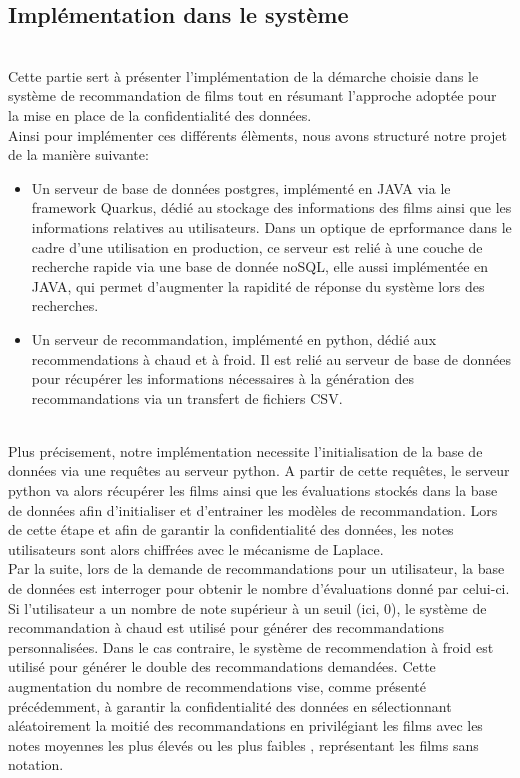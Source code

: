 \documentclass{article}
\begin{document}
\subsection{Implémentation dans le système}
$ $\\
Cette partie sert à présenter l'implémentation de la démarche choisie dans le système de recommandation de films tout en résumant l'approche adoptée pour la mise en place de la confidentialité des données.\\
Ainsi pour implémenter ces différents élèments, nous avons structuré notre projet de la manière suivante:\\
\begin{itemize}
    \item Un serveur de base de données postgres, implémenté en JAVA via le framework Quarkus, dédié au stockage des informations des films ainsi que les informations relatives au utilisateurs.
    Dans un optique de eprformance dans le cadre d'une utilisation en production, ce serveur est relié à une couche de recherche rapide via une base de donnée noSQL, elle aussi implémentée en JAVA, 
    qui permet d'augmenter la rapidité de réponse du système lors des recherches.
    \item Un serveur de recommandation, implémenté en python, dédié aux recommendations à chaud et à froid. Il est relié au serveur de base de données pour récupérer les 
    informations nécessaires à la génération des recommandations via un transfert de fichiers CSV.
\end{itemize}
$ $\\
Plus précisement, notre implémentation necessite l'initialisation de la base de données via une requêtes au serveur python. A partir de cette requêtes, le serveur python va alors 
récupérer les films ainsi que les évaluations stockés dans la base de données afin d'initialiser et d'entrainer les modèles de recommandation. Lors de cette étape et afin de garantir 
la confidentialité des données, les notes utilisateurs sont alors chiffrées avec le mécanisme de Laplace.\\
Par la suite, lors de la demande de recommandations pour un utilisateur, la base de données est interroger pour obtenir le nombre d'évaluations donné par celui-ci. Si l'utilisateur a 
un nombre de note supérieur à un seuil (ici, 0), le système de recommandation à chaud est utilisé pour générer des recommandations personnalisées. Dans le cas contraire, le système de 
recommendation à froid est utilisé pour générer le double des recommandations demandées. Cette augmentation du nombre de recommendations vise, comme présenté précédemment, à garantir la 
confidentialité des données en sélectionnant aléatoirement la moitié des recommandations en privilégiant les films avec les notes moyennes les plus élevés ou les plus faibles , représentant
les films sans notation.
\end{document}
